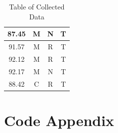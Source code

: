 \documentclass[paper=a4, fontsize=11pt]{scrartcl} %
\numberwithin{equation}{section} %
\numberwithin{figure}{section} %
\numberwithin{table}{section} %
\begin{document}
\begin{table}[H]
\begin{tabular}{|c|c|c|c|}
87.45         & M               & N                & T             \\ \hline
91.57         & M               & R                & T             \\ \hline
92.12         & M               & R                & T             \\ \hline
92.17         & M               & N                & T             \\ \hline
88.42         & C               & R                & T             \\ \hline
\end{tabular}
\caption*{Table of Collected Data}
\end{table}

\newpage
\section*{Code Appendix}

\end{document}
